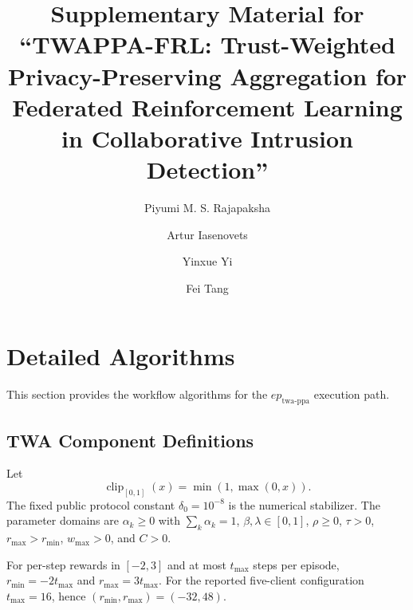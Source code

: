 \documentclass{article}
\begin{document}
\title{Supplementary Material for\\``TWAPPA-FRL: Trust-Weighted Privacy-Preserving Aggregation for Federated Reinforcement Learning in Collaborative Intrusion Detection''}
\author{Piyumi M. S. Rajapaksha \and Artur Iasenovets \and Yinxue Yi \and Fei Tang}
\date{}
\maketitle

\section{Detailed Algorithms}
This section provides the workflow algorithms for the $ep_{\mathrm{twa\text{-}ppa}}$ execution path.

\subsection{TWA Component Definitions}\label{sec:supp_twa_components}

Let
\[
\operatorname{clip}_{[0,1]}(x)=\min(1,\max(0,x)).
\]
The fixed public protocol constant $\delta_0=10^{-8}$ is the numerical
stabilizer.
The parameter domains are $\alpha_k\geq0$ with $\sum_k\alpha_k=1$,
$\beta,\lambda\in[0,1]$, $\rho\geq0$, $\tau>0$, $r_{\max}>r_{\min}$,
$w_{\max}>0$, and $C>0$.

For per-step rewards in $[-2,3]$ and at most $t_{\max}$ steps per episode,
$r_{\min}=-2t_{\max}$ and $r_{\max}=3t_{\max}$. For the reported
five-client configuration $t_{\max}=16$, hence
$(r_{\min},r_{\max})=(-32,48)$.
\end{document}
